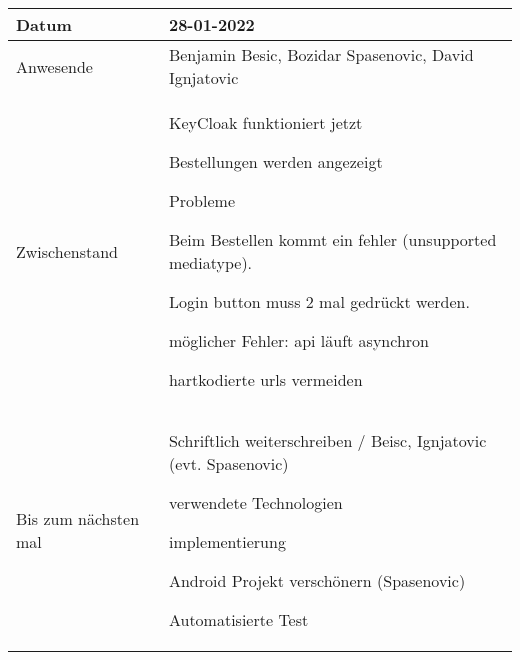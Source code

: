 \begin{center}
    \begin{tabular}{ |p{3cm}|p{10cm}|  }
        \hline
        Datum & 28-01-2022\\
        \hline
        Anwesende & Benjamin Besic, Bozidar Spasenovic, David Ignjatovic\\

        \hline
        Zwischenstand& 

        KeyCloak funktioniert jetzt
    
        Bestellungen werden angezeigt
    
   Probleme
    
        Beim Bestellen kommt ein fehler (unsupported mediatype).
    
        Login button muss 2 mal gedrückt werden.
    
            möglicher Fehler: api läuft asynchron
    
        hartkodierte urls vermeiden
    
    \\
        \hline
        Bis zum nächsten mal &  

        Schriftlich weiterschreiben / Beisc, Ignjatovic (evt. Spasenovic)
    
            verwendete Technologien
    
            implementierung
    
        Android Projekt verschönern (Spasenovic)
    
        Automatisierte Test
    \\
        \hline
    \end{tabular}
\end{center}
